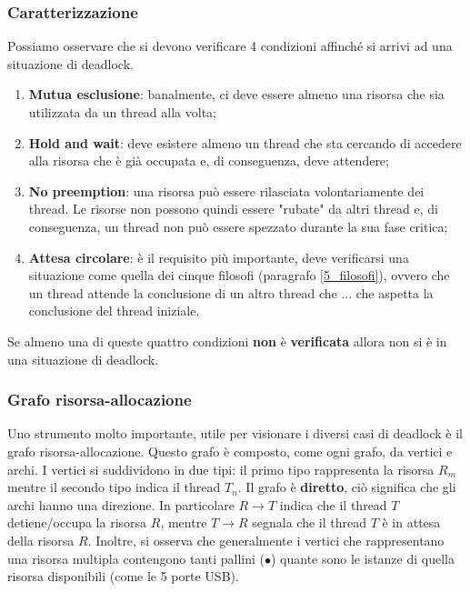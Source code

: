 \subsubsection{Caratterizzazione}\label{4_punti_deadlock}
Possiamo osservare che si devono verificare 4 condizioni affinché si arrivi ad una situazione di deadlock.
\vspace{-5px}
\begin{enumerate}
    \setlength{\itemsep}{-.15 em}
    \item \textbf{Mutua esclusione}: banalmente, ci deve essere almeno una risorsa che sia utilizzata da un thread alla volta;
    \item \textbf{Hold and wait}: deve esistere almeno un thread che sta cercando di accedere alla risorsa che è già occupata e, di conseguenza, deve attendere;
    \item \textbf{No preemption}: una risorsa può essere rilasciata volontariamente dei thread. Le risorse non possono quindi essere "rubate" da altri thread e, di conseguenza, un thread non può essere spezzato durante la sua fase critica;
    \item \textbf{Attesa circolare}: è il requisito più importante, deve verificarsi una situazione come quella dei cinque filosofi (paragrafo \ref{5_filosofi}), ovvero che un thread attende la conclusione di un altro thread che ... che aspetta la conclusione del thread iniziale.
\end{enumerate}
Se almeno una di queste quattro condizioni \textbf{non} è \textbf{verificata} allora non si è in una situazione di deadlock.

% 
\subsubsection{Grafo risorsa-allocazione}
Uno strumento molto importante, utile per visionare i diversi casi di deadlock è il grafo risorsa-allocazione. Questo grafo è composto, come ogni grafo, da vertici e archi. I vertici si suddividono in due tipi: il primo tipo rappresenta la risorsa $R_m$ mentre il secondo tipo indica il thread $T_n$. Il grafo è \textbf{diretto}, ciò significa che gli archi hanno una direzione. In particolare $R \to T$ indica che il thread $T$ detiene/occupa la risorsa $R$, mentre $T \to R$ segnala che il thread $T$ è in attesa della risorsa $R$. Inoltre, si osserva che generalmente i vertici che rappresentano una risorsa multipla contengono tanti pallini ($\bullet$) quante sono le istanze di quella risorsa disponibili (come le 5 porte USB). 

